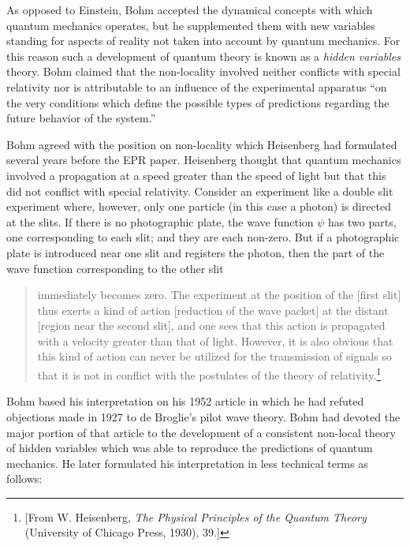 \documentclass[11pt]{memoir}
\begin{document}
As opposed to Einstein, Bohm accepted the dynamical concepts with which
quantum mechanics operates, but he supplemented them with new variables
standing for aspects of reality not taken into account by quantum
mechanics. For this reason such a development of quantum theory is known
as a \emph{hidden variables} theory. Bohm claimed that the non-locality
involved neither conflicts with special relativity nor is attributable
to an influence of the experimental apparatus ``on the very conditions
which define the possible types of predictions regarding the future
behavior of the system.''

Bohm agreed with the position on non-locality which Heisenberg had
formulated several years before the EPR paper. Heisenberg thought that
quantum mechanics involved a propagation at a speed greater than the
speed of light but that this did not conflict with special relativity.
Consider an experiment like a double slit experiment where, however,
only one particle (in this case a photon) is directed at the slits. If
there is no photographic plate, the wave function $\psi$ has two parts, one
corresponding to each slit; and they are each non-zero. But if a
photographic plate is introduced near one slit and registers the photon,
then the part of the wave function corresponding to the other slit

\begin{quote}
immediately becomes zero. The experiment at the position of the {[}first
slit{]} thus exerts a kind of action {[}reduction of the wave packet{]}
at the distant {[}region near the second slit{]}, and one sees that this
action is propagated with a velocity greater than that of light.
However, it is also obvious that this kind of action can never be
utilized for the transmission of signals so that it is not in conflict
with the postulates of the theory of relativity.\footnote{{[}From W.
  Heisenberg, \emph{The Physical Principles of the Quantum Theory}
  (University of Chicago Press, 1930), 39.{]}}
\end{quote}

Bohm based his interpretation on his 1952 article in which he had
refuted objections made in 1927 to de Broglie's pilot wave theory. Bohm
had devoted the major portion of that article to the development of a
consistent non-local theory of hidden variables which was able to
reproduce the predictions of quantum mechanics. He later formulated his
interpretation in less technical terms as follows:
\end{document}
